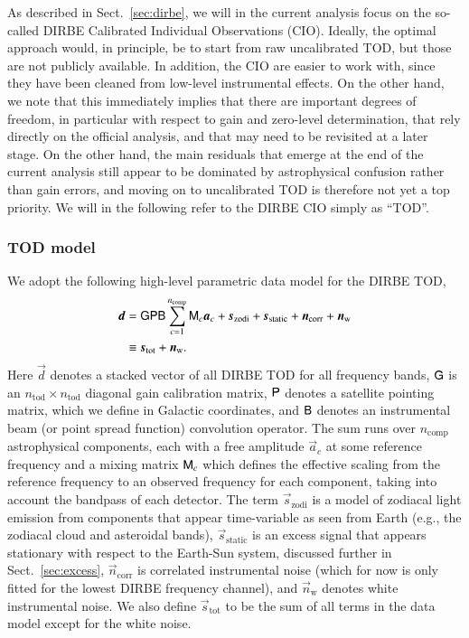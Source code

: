 \documentclass{aa}
\newcommand{\dv}[0]{\vec{d}}
\newcommand{\B}[0]{\tens{B}}
\newcommand{\G}[0]{\tens{G}}
\newcommand{\n}[0]{\vec{n}}
\newcommand{\s}[0]{\vec{s}}
\renewcommand{\a}[0]{\vec{a}}
\newcommand{\M}[0]{\tens{M}}
\renewcommand{\P}[0]{\tens{P}}
\begin{document}
As described in Sect.~\ref{sec:dirbe}, we will in the current analysis
focus on the so-called DIRBE Calibrated Individual Observations
(CIO). Ideally, the optimal approach would, in principle, be to start from raw uncalibrated TOD, but those are not
publicly available. In addition, the CIO are easier to work with,
since they have been cleaned from low-level instrumental effects. On
the other hand, we note that this immediately implies that there are
important degrees of freedom, in particular with respect to gain and
zero-level determination, that rely directly on the official analysis,
and that may need to be revisited at a later stage. On the other hand,
the main residuals that emerge at the end of the current analysis
still appear to be dominated by astrophysical confusion rather than
gain errors, and moving on to uncalibrated TOD is therefore not yet a
top priority. We will in the following refer to the DIRBE CIO simply
as ``TOD''.

\subsubsection{TOD model}

We adopt the following high-level parametric data model for the DIRBE
TOD,
\begin{align}
	\label{eq:model}
	\dv &=\G\P\B\sum_{c=1}^{n_{\mathrm{comp}}}\M_c\a_c+\s_{\mathrm{zodi}} +
          \s_{\mathrm{static}} + \n_\mathrm{corr} + \n_\mathrm w\\
        &\equiv \s_{\mathrm{tot}} + \n_{\mathrm{w}}.
\end{align}
Here $\dv$ denotes a stacked vector of all DIRBE TOD for all frequency
bands, $\G$ is an $n_{\mathrm{tod}}\times n_{\mathrm{tod}}$ diagonal
gain calibration matrix, $\P$ denotes a satellite
pointing matrix, which we define in Galactic coordinates, and $\B$
denotes an instrumental beam (or point spread function) convolution
operator.  The sum runs over $n_{\mathrm{comp}}$ astrophysical
components, each with a free amplitude $\a_c$ at some reference
frequency and a mixing matrix $\M_c$ which defines the effective
scaling from the reference frequency to an observed frequency for each
component, taking into account the bandpass of each detector. The term
$\s_{\mathrm{zodi}}$ is a model of zodiacal light emission from
components that appear time-variable as seen from Earth (e.g., the
zodiacal cloud and asteroidal bands), $\s_{\mathrm{static}}$ is an
excess signal that appears stationary with respect to the Earth-Sun
system, discussed further in Sect.~\ref{sec:excess},
$\n_{\mathrm{corr}}$ is correlated instrumental noise (which for now
is only fitted for the lowest DIRBE frequency channel), and
$\n_{\mathrm{w}}$ denotes white instrumental noise. We also define
$\s_{\mathrm{tot}}$ to be the sum of all terms in the data model
except for the white noise.
\end{document}
